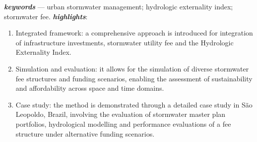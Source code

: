 \documentclass[11pt]{article}
\begin{document}
\begin{adjustwidth}{20pt}{20pt}
\begin{spacing}{0.8}
    \noindent \textit{\textbf{keywords}} --- urban stormwater management; hydrologic externality index; stormwater fee.
    \newline
    \newline
    \newline
    \noindent \textit{\textbf{highlights}}:
        \begin{enumerate}
            \item Integrated framework: a comprehensive approach is introduced for integration of infrastructure investments, stormwater utility fee and the Hydrologic Externality Index.
            \item Simulation and evaluation: it allows for the simulation of diverse stormwater fee structures and funding scenarios, enabling the assessment of sustainability and affordability across space and time domains.
            \item Case study: the method is demonstrated through a detailed case study in São Leopoldo, Brazil, involving the evaluation of stormwater master plan portfolios, hydrological modelling and performance evaluations of a fee structure under alternative funding scenarios.
        \end{enumerate}
\end{spacing}
\end{adjustwidth}
\end{document}
